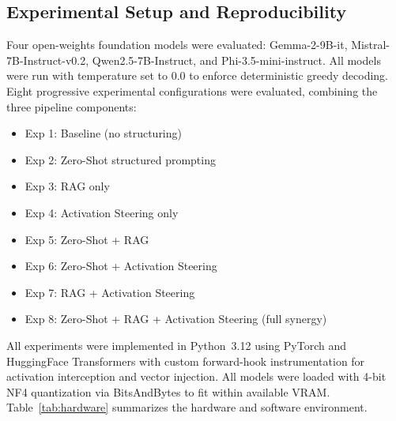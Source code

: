 \documentclass{ieeeaccess}
\begin{document}
\subsection{Experimental Setup and Reproducibility}
\label{sec:setup}

Four open-weights foundation models were evaluated: Gemma-2-9B-it, Mistral-7B-Instruct-v0.2, Qwen2.5-7B-Instruct, and Phi-3.5-mini-instruct. All models were run with temperature set to 0.0 to enforce deterministic greedy decoding. Eight progressive experimental configurations were evaluated, combining the three pipeline components:

\begin{itemize}
    \item Exp 1: Baseline (no structuring)
    \item Exp 2: Zero-Shot structured prompting
    \item Exp 3: RAG only
    \item Exp 4: Activation Steering only
    \item Exp 5: Zero-Shot + RAG
    \item Exp 6: Zero-Shot + Activation Steering
    \item Exp 7: RAG + Activation Steering
    \item Exp 8: Zero-Shot + RAG + Activation Steering (full synergy)
\end{itemize}

All experiments were implemented in Python~3.12 using PyTorch and HuggingFace Transformers with custom forward-hook instrumentation for activation interception and vector injection. All models were loaded with 4-bit NF4 quantization via BitsAndBytes to fit within available VRAM. Table~\ref{tab:hardware} summarizes the hardware and software environment.
\end{document}

